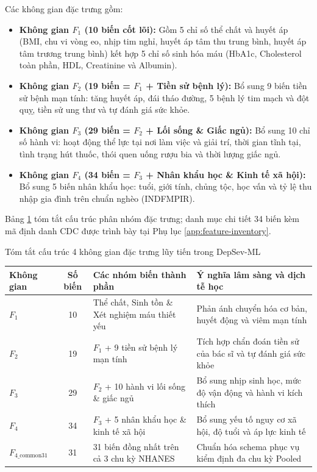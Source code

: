 Các không gian đặc trưng gồm:
\begin{itemize}
    \item \textbf{Không gian $F_1$ (10 biến cốt lõi):} Gồm 5 chỉ số thể chất và huyết áp (BMI, chu vi vòng eo, nhịp tim nghỉ, huyết áp tâm thu trung bình, huyết áp tâm trương trung bình) kết hợp 5 chỉ số sinh hóa máu (HbA1c, Cholesterol toàn phần, HDL, Creatinine và Albumin).
    \item \textbf{Không gian $F_2$ (19 biến = $F_1$ + Tiền sử bệnh lý):} Bổ sung 9 biến tiền sử bệnh mạn tính: tăng huyết áp, đái tháo đường, 5 bệnh lý tim mạch và đột quỵ, tiền sử ung thư và tự đánh giá sức khỏe.
    \item \textbf{Không gian $F_3$ (29 biến = $F_2$ + Lối sống \& Giấc ngủ):} Bổ sung 10 chỉ số hành vi: hoạt động thể lực tại nơi làm việc và giải trí, thời gian tĩnh tại, tình trạng hút thuốc, thói quen uống rượu bia và thời lượng giấc ngủ.
    \item \textbf{Không gian $F_4$ (34 biến = $F_3$ + Nhân khẩu học \& Kinh tế xã hội):} Bổ sung 5 biến nhân khẩu học: tuổi, giới tính, chủng tộc, học vấn và tỷ lệ thu nhập gia đình trên chuẩn nghèo (INDFMPIR).
\end{itemize}

Bảng \ref{tab:feature-summary} tóm tắt cấu trúc phân nhóm đặc trưng; danh mục chi tiết 34 biến kèm mã định danh CDC được trình bày tại Phụ lục \ref{app:feature-inventory}.

\begin{table}{Tóm tắt cấu trúc 4 không gian đặc trưng lũy tiến trong DepSev-ML}
\centering
\footnotesize
\setlength{\tabcolsep}{4pt}
\label{tab:feature-summary}
\begin{tabularx}{\textwidth}{l c p{5.5cm} X}
\toprule
\textbf{Không gian} & \textbf{Số biến} & \textbf{Các nhóm biến thành phần} & \textbf{Ý nghĩa lâm sàng và dịch tễ học} \\
\midrule
$F_1$ & 10 & Thể chất, Sinh tồn \& Xét nghiệm máu thiết yếu & Phản ánh chuyển hóa cơ bản, huyết động và viêm mạn tính \\
$F_2$ & 19 & $F_1$ + 9 tiền sử bệnh lý mạn tính & Tích hợp chẩn đoán tiền sử của bác sĩ và tự đánh giá sức khỏe \\
$F_3$ & 29 & $F_2$ + 10 hành vi lối sống \& giấc ngủ & Bổ sung nhịp sinh học, mức độ vận động và hành vi kích thích \\
$F_4$ & 34 & $F_3$ + 5 nhân khẩu học \& kinh tế xã hội & Bổ sung yếu tố nguy cơ xã hội, độ tuổi và áp lực kinh tế \\
\midrule
$F_{4\_\text{common31}}$ & 31 & 31 biến đồng nhất trên cả 3 chu kỳ NHANES & Chuẩn hóa schema phục vụ kiểm định đa chu kỳ Pooled \\
\bottomrule
\end{tabularx}
\end{table}

